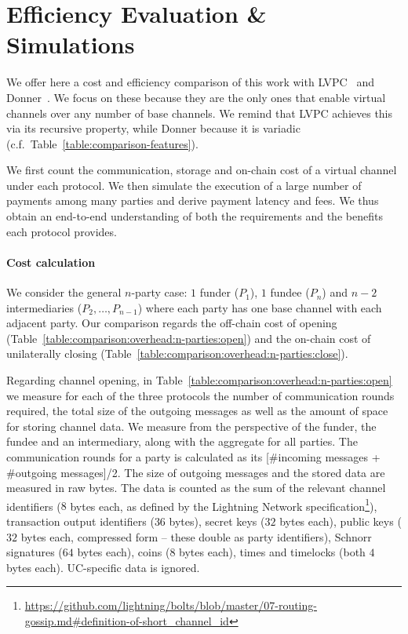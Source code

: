 \section{Efficiency Evaluation \& Simulations}
  \label{section:comparison}
  We offer here a cost and efficiency comparison of this work with
  LVPC~\cite{10.1007/978-3-030-65411-5_18} and Donner~\cite{donner}. We focus on
  these because they are the only ones that enable
  virtual channels over any number of base channels. We remind that LVPC
  achieves this via its recursive property, while Donner
  because it is variadic (c.f.\ Table~\ref{table:comparison-features}).

  We first count the communication, storage and on-chain cost of a virtual
  channel under each protocol. We then simulate the execution of a large number
  of payments among many parties and derive payment latency and fees. We thus
  obtain an end-to-end understanding of both the requirements and the benefits
  each protocol provides.

  \paragraph{Cost calculation} We consider the general $n$-party case: $1$
  funder ($P_1$), $1$ fundee ($P_n$) and $n-2$ intermediaries ($P_2, \dots,
  P_{n-1}$) where each party has one base channel with each adjacent party. Our
  comparison regards the off-chain cost of opening
  (Table~\ref{table:comparison:overhead:n-parties:open}) and the on-chain cost
  of unilaterally closing
  (Table~\ref{table:comparison:overhead:n-parties:close}).

  Regarding channel opening, in
  Table~\ref{table:comparison:overhead:n-parties:open} we measure for each of
  the three protocols the number of communication rounds required, the total
  size of the outgoing messages as well as the amount of space for storing
  channel data. We measure from the perspective of the funder, the fundee
  and an intermediary, along with the aggregate for all parties. The
  communication rounds for a party is calculated as its [\#incoming messages +
  \#outgoing messages]/2. The size of outgoing messages and the stored data are
  measured in raw bytes. The data is counted as the sum of the relevant channel
  identifiers ($8$ bytes each, as defined by the Lightning Network
  specification\footnote{\url{https://github.com/lightning/bolts/blob/master/07-routing-gossip.md\#definition-of-short_channel_id}}),
  transaction output identifiers ($36$ bytes), secret keys ($32$ bytes each),
  public keys ($32$ bytes each, compressed form -- these double as party
  identifiers), Schnorr signatures ($64$ bytes each), coins ($8$ bytes each),
  times and timelocks (both $4$ bytes each). UC-specific data is ignored.

